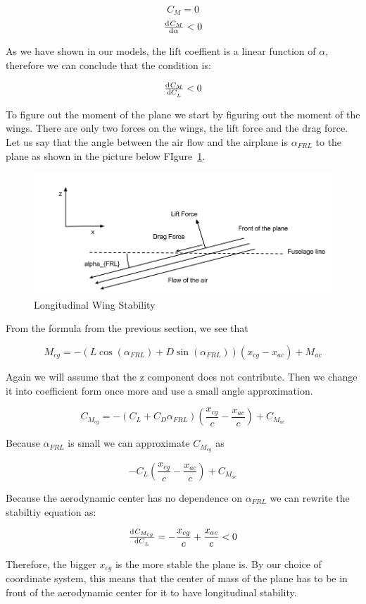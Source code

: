 \begin{equation}
C_M = 0
\end{equation}
\begin{equation}
\od{C_M}{\alpha} < 0
\label{eq:long_stability}
\end{equation}

As we have shown in our models, the lift coeffient is a linear function of $\alpha$, therefore
we can conclude that the condition is:

\[\od{C_M}{C_L} < 0 \]

To figure out the moment of the plane we start by figuring out the moment of the wings.
There are only two forces on the wings, the lift force and the drag force. Let us say
that the angle between the air flow and the airplane is $\alpha_{FRL}$ to the plane as shown in the picture below 
FIgure~\ref{fig:longitudinal_stability1}.

\begin{figure}[hl]
  \centering
    \includegraphics[scale=.5]{figures/longitudinal_stability1.png}
    \caption{Longitudinal Wing Stability}
  \label{fig:longitudinal_stability1}
\end{figure}

From the formula from the previous section, we see that 

\[M_{cg}  = -(L\cos(\alpha_{FRL}) + D\sin(\alpha_{FRL}))(x_{cg} - x_{ac}) + M_{ac}\]

Again we will assume that the z component does not contribute. Then we change it into
coefficient form once more and use a small angle approximation.

\[ C_{M_{cg}} = -(C_{L} + C_D \alpha_{FRL}) (\frac{x_{cg}}{c} - \frac{x_{ac}}{c}) + C_{M_{ac}} \]

Because $\alpha_{FRL}$ is small we can approximate $C_{M_{cg}}$ as

\[-C_L (\frac{x_{cg}}{c} - \frac{x_{ac}}{c}) + C_{M_{ac}} \]

Because the aerodynamic center has no dependence on $\alpha_{FRL}$ we can rewrite the
stabiltiy equation as:

\[\od{C_{M_{cg}}}{C_L} = - \frac{x_{cg}}{c} + \frac{x_{ac}}{c} < 0\]

Therefore, the bigger $x_{cg}$ is the more stable the plane is. By our choice of coordinate system,
this means that the center of mass of the plane has to be in front of the aerodynamic center for it to have
longitudinal stability.

              

